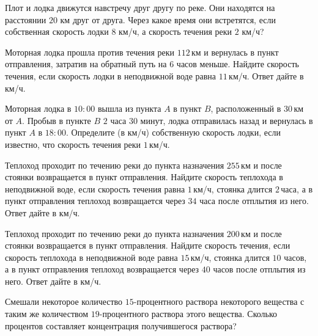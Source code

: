 \begin{class}[number=8]
	\begin{listofex}
		\item Плот и лодка движутся навстречу друг другу по реке. Они находятся на расстоянии \(20\) км друг от друга. Через какое время они встретятся, если собственная скорость лодки \(8\) км/ч, а скорость течения реки \(2\) км/ч?
		\item Моторная лодка прошла против течения реки \(112\) км и вернулась в пункт отправления, затратив на обратный путь на \(6\) часов меньше. Найдите скорость течения, если скорость лодки в неподвижной воде равна \(11\) км/ч. Ответ дайте в км/ч.
		\item Моторная лодка в \(10:00\) вышла из пункта \(A\) в пункт \(B\), расположенный в \(30\) км от \(A\). Пробыв в пункте \(B\) \(2\) часа \(30\) минут, лодка отправилась назад и вернулась в пункт \(A\) в \(18:00\). Определите (в км/ч) собственную скорость лодки, если известно, что скорость течения реки \(1\) км/ч.
		\item Теплоход проходит по течению реки до пункта назначения \(255\) км и после стоянки возвращается в пункт отправления. Найдите скорость теплохода в неподвижной воде, если скорость течения равна \(1\) км/ч, стоянка длится \(2\) часа, а в пункт отправления теплоход возвращается через \(34\) часа после отплытия из него. Ответ дайте в км/ч.
		\item Теплоход проходит по течению реки до пункта назначения \(200\) км и после стоянки возвращается в пункт отправления. Найдите скорость течения, если скорость теплохода в неподвижной воде равна \(15\) км/ч, стоянка длится \(10\) часов, а в пункт отправления теплоход возвращается через \(40\) часов после отплытия из него. Ответ дайте в км/ч.
		\item Смешали некоторое количество \(15\)-процентного раствора некоторого вещества с таким же количеством \(19\)-процентного раствора этого вещества. Сколько процентов составляет концентрация получившегося раствора?

\end{listofex}
\end{class}
